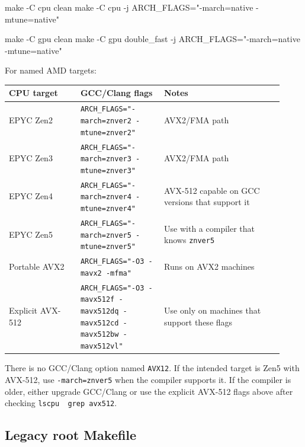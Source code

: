 \documentclass[
  10pt,
  a4paper,
]{article}
\newenvironment{Shaded}{}{}
\newcommand{\AttributeTok}[1]{\textcolor[rgb]{0.49,0.56,0.16}{#1}}
\newcommand{\FunctionTok}[1]{\textcolor[rgb]{0.02,0.16,0.49}{#1}}
\newcommand{\NormalTok}[1]{#1}
\newcommand{\StringTok}[1]{\textcolor[rgb]{0.25,0.44,0.63}{#1}}
\begin{document}
\begin{Shaded}
\begin{Highlighting}[]
\FunctionTok{make} \AttributeTok{{-}C}\NormalTok{ cpu clean}
\FunctionTok{make} \AttributeTok{{-}C}\NormalTok{ cpu }\AttributeTok{{-}j}\NormalTok{ ARCH\_FLAGS=}\StringTok{"{-}march=native {-}mtune=native"}

\FunctionTok{make} \AttributeTok{{-}C}\NormalTok{ gpu clean}
\FunctionTok{make} \AttributeTok{{-}C}\NormalTok{ gpu double\_fast }\AttributeTok{{-}j}\NormalTok{ ARCH\_FLAGS=}\StringTok{"{-}march=native {-}mtune=native"}
\end{Highlighting}
\end{Shaded}

For named AMD targets:

\begin{longtable}[]{@{}L{0.24\linewidth}L{0.28\linewidth}L{0.40\linewidth}@{}}
\toprule\noalign{}
CPU target & GCC/Clang flags & Notes \\
\midrule\noalign{}
\endhead
\bottomrule\noalign{}
\endlastfoot
EPYC Zen2 & \texttt{ARCH\_FLAGS="-march=znver2\ -mtune=znver2"} &
AVX2/FMA path \\
EPYC Zen3 & \texttt{ARCH\_FLAGS="-march=znver3\ -mtune=znver3"} &
AVX2/FMA path \\
EPYC Zen4 & \texttt{ARCH\_FLAGS="-march=znver4\ -mtune=znver4"} &
AVX-512 capable on GCC versions that support it \\
EPYC Zen5 & \texttt{ARCH\_FLAGS="-march=znver5\ -mtune=znver5"} & Use
with a compiler that knows \texttt{znver5} \\
Portable AVX2 & \texttt{ARCH\_FLAGS="-O3\ -mavx2\ -mfma"} & Runs on AVX2
machines \\
Explicit AVX-512 &
\texttt{ARCH\_FLAGS="-O3\ -mavx512f\ -mavx512dq\ -mavx512cd\ -mavx512bw\ -mavx512vl"}
& Use only on machines that support these flags \\
\end{longtable}

There is no GCC/Clang option named \texttt{AVX12}. If the intended
target is Zen5 with AVX-512, use \texttt{-march=znver5} when the
compiler supports it. If the compiler is older, either upgrade GCC/Clang
or use the explicit AVX-512 flags above after checking
\texttt{lscpu\ \textbar{}\ grep\ avx512}.

\subsection{Legacy root Makefile}\label{legacy-root-makefile}
\end{document}
